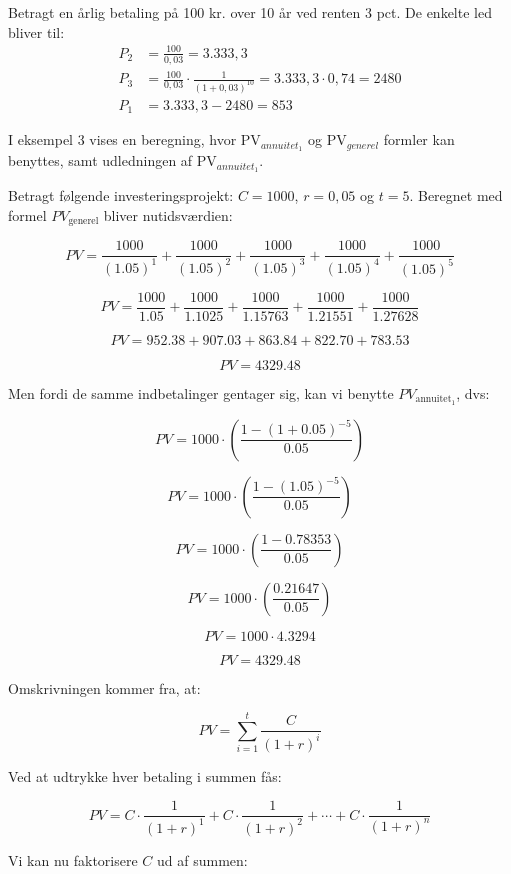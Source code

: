 \documentclass[10pt,reqno, usenames]{article}
\begin{document}
Betragt en årlig betaling på 100 kr. over 10 år ved renten 3 pct. De enkelte led bliver til: 
\begin{align*}
    P_2 &= \frac{100}{0,03} = 3.333,3 \\
    P_3 &= \frac{100}{0,03} \cdot \frac{1}{(1+0,03)^{10}} = 3.333,3 \cdot 0,74 = 2480 \\
    P_1 &= 3.333,3 - 2480 = 853
\end{align*}

I eksempel 3 vises en beregning, hvor PV$_{annuitet_1}$ og PV$_{generel}$  formler kan benyttes, samt udledningen af PV$_{annuitet_1}$.

\begin{tcolorbox}[breakable, colback=red!5!white, colframe=red!50!black, title= Eksempel 3: Beregning af nutidsværdi for betalingsrækker]
Betragt følgende investeringsprojekt: $C=1000$, $r=0,05$ og $t=5$. 
Beregnet med formel \( PV_{\text{generel}} \) bliver nutidsværdien:

\[
PV = \frac{1000}{(1.05)^1} + \frac{1000}{(1.05)^2} + \frac{1000}{(1.05)^3} + \frac{1000}{(1.05)^4} + \frac{1000}{(1.05)^5}
\]

\[
PV = \frac{1000}{1.05} + \frac{1000}{1.1025} + \frac{1000}{1.15763} + \frac{1000}{1.21551} + \frac{1000}{1.27628}
\]

\[
PV = 952.38 + 907.03 + 863.84 + 822.70 + 783.53
\]

\[
PV = 4329.48
\]

Men fordi de samme indbetalinger gentager sig, kan vi benytte \( PV_{\text{annuitet$_1$}} \), dvs:

\[
PV = 1000 \cdot \left( \frac{1 - (1 + 0.05)^{-5}}{0.05} \right)
\]

\[
PV = 1000 \cdot \left( \frac{1 - (1.05)^{-5}}{0.05} \right)
\]

\[
PV = 1000 \cdot \left( \frac{1 - 0.78353}{0.05} \right)
\]

\[
PV = 1000 \cdot \left( \frac{0.21647}{0.05} \right)
\]

\[
PV = 1000 \cdot 4.3294
\]

\[
PV = 4329.48
\]

Omskrivningen kommer fra, at:

\[
PV = \sum_{i=1}^{t} \frac{C}{(1 + r)^i}
\]

Ved at udtrykke hver betaling i summen fås:

\[
PV = C \cdot \frac{1}{(1 + r)^1} + C \cdot \frac{1}{(1 + r)^2} + \cdots + C \cdot \frac{1}{(1 + r)^n}
\]

Vi kan nu faktorisere \( C \) ud af summen:


\end{tcolorbox}
\end{document}

